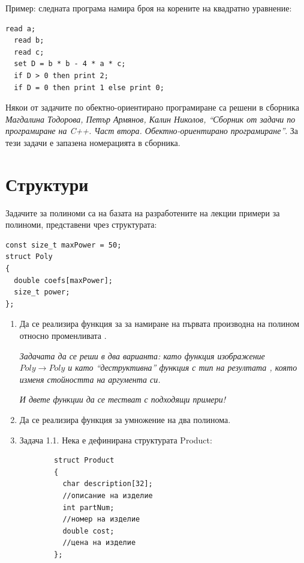 {\begin{enumerate}[resume]
Пример: следната програма намира броя на корените на квадратно уравнение:
\begin{lstlisting}[mathescape]
  read a;
  read b;
  read c;
  set D = b * b - 4 * a * c;
  if D > 0 then print 2;
  if D = 0 then print 1 else print 0;
\end{lstlisting}

\end{enumerate}

\pagebreak

\small{Някои от задачите по обектно-ориентирано програмиране са решени в сборника \cite{sbornik2}\textit{Магдалина Тодорова, Петър Армянов, Калин Николов, ``Сборник от задачи по програмиране на C++. Част втора. Обектно-ориентирано програмиране''}. За тези задачи е запазена номерацията в сборника.}

\pagebreak

\clearpage\section{Структури}

\begin{mdframed}[hidealllines=true,backgroundcolor=gray!20]
Задачите за полиноми са на базата на разработените на лекции примери за полиноми, представени чрез структурата:

\begin{verbatim}
const size_t maxPower = 50;
struct Poly
{
  double coefs[maxPower];
  size_t power;
};
\end{verbatim}
\end{mdframed}

\begin{enumerate}


  \item Да се реализира функция  за за намиране на първата производна на полином относно променливата .

  \emph{Задачата да се реши в два варианта: като функция изображение $Poly \rightarrow Poly$ и като ``деструктивна'' функция с тип на резултата , която изменя стойността на аргумента си.}

  \emph{И двете функции да се тестват с подходящи примери!}
  \item Да се реализира функция  за умножение на два полинома.

  \item Задача 1.1. \cite{sbornik2}  \label{zad:structproduct} Нека е дефинирана структурата Product:
	\begin{verbatim}
		struct Product
		{
		  char description[32];
		  //описание на изделие
		  int partNum;
		  //номер на изделие
		  double cost;
		  //цена на изделие
		};


\end{verbatim}
\end{enumerate}}
